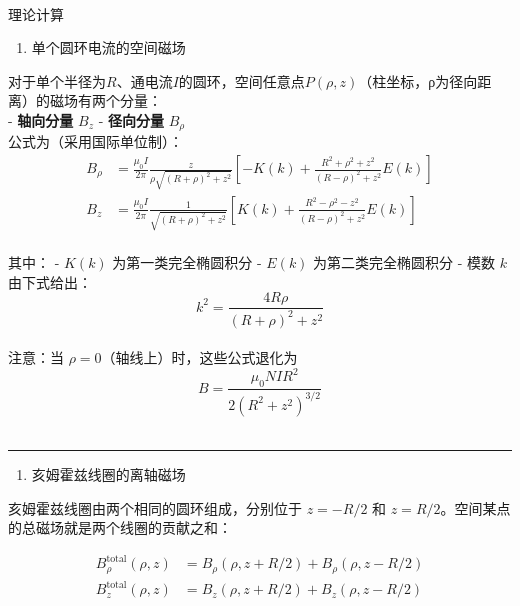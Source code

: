 \documentclass[11pt]{ctexart}
\providecommand{\tightlist}{%
      \setlength{\itemsep}{0pt}\setlength{\parskip}{0pt}}
\begin{document}
    \begin{center}
    \end{center}
    { \hspace*{\fill} \\}
    

理论计算 \\
\begin{enumerate}
\def\labelenumi{\arabic{enumi}.}
\setcounter{enumi}{0}
\tightlist
\item
  单个圆环电流的空间磁场
\end{enumerate}

对于单个半径为\(R\)、通电流\(I\)的圆环，空间任意点\(P(ρ, z)\)（柱坐标，ρ为径向距离）的磁场有两个分量： \\
- \textbf{轴向分量} \(B_z\) - \textbf{径向分量} \(B_\rho\) \\
公式为（采用国际单位制）： \\
\[
\begin{aligned}
B_\rho &= \frac{\mu_0 I}{2\pi} \frac{z}{\rho\sqrt{(R+\rho)^2 + z^2}} \left[ -K(k) + \frac{R^2+\rho^2+z^2}{(R-\rho)^2+z^2} E(k) \right] \\
B_z &= \frac{\mu_0 I}{2\pi} \frac{1}{\sqrt{(R+\rho)^2 + z^2}} \left[ K(k) + \frac{R^2-\rho^2-z^2}{(R-\rho)^2+z^2} E(k) \right]
\end{aligned}
\] \\
其中： - \(K(k)\) 为第一类完全椭圆积分 - \(E(k)\) 为第二类完全椭圆积分 -
模数 \(k\) 由下式给出： \[
k^2 = \frac{4R\rho}{(R+\rho)^2 + z^2}
\] \\
注意：当 \(\rho = 0\)（轴线上）时，这些公式退化为 \\
\[
B = \frac{\mu_0 N I R^2}{2\left(R^2 + z^2\right)^{3/2}}
\] \\

\begin{center}\rule{0.5\linewidth}{0.5pt}\end{center}

\begin{enumerate}
\def\labelenumi{\arabic{enumi}.}
\setcounter{enumi}{1}
\tightlist
\item
  亥姆霍兹线圈的离轴磁场
\end{enumerate}

亥姆霍兹线圈由两个相同的圆环组成，分别位于 \(z = -R/2\) 和
\(z = R/2\)。空间某点的总磁场就是两个线圈的贡献之和：

\[
\begin{aligned}
B_{\rho}^{\text{total}}(\rho, z) &= B_\rho(\rho, z + R/2) + B_\rho(\rho, z - R/2) \\
B_z^{\text{total}}(\rho, z) &= B_z(\rho, z + R/2) + B_z(\rho, z - R/2)
\end{aligned}
\]
\end{document}
